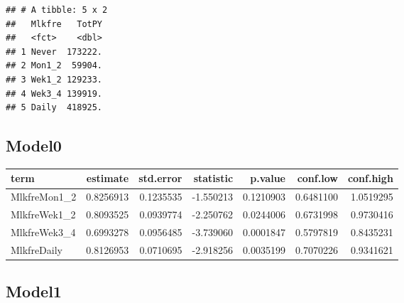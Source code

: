 \documentclass[
]{article}
\newenvironment{Shaded}{\begin{snugshade}}{\end{snugshade}}
\newcommand{\DataTypeTok}[1]{\textcolor[rgb]{0.13,0.29,0.53}{#1}}
\newcommand{\KeywordTok}[1]{\textcolor[rgb]{0.13,0.29,0.53}{\textbf{#1}}}
\newcommand{\NormalTok}[1]{#1}
\newcommand{\OperatorTok}[1]{\textcolor[rgb]{0.81,0.36,0.00}{\textbf{#1}}}
\newcommand{\OtherTok}[1]{\textcolor[rgb]{0.56,0.35,0.01}{#1}}
\newcommand{\StringTok}[1]{\textcolor[rgb]{0.31,0.60,0.02}{#1}}
\begin{document}
\begin{verbatim}
## # A tibble: 5 x 2
##   Mlkfre   TotPY
##   <fct>    <dbl>
## 1 Never  173222.
## 2 Mon1_2  59904.
## 3 Wek1_2 129233.
## 4 Wek3_4 139919.
## 5 Daily  418925.
\end{verbatim}

\hypertarget{model0-2}{%
\subsection{Model0}\label{model0-2}}

\begin{Shaded}
\end{Shaded}

\begin{longtable}[]{@{}lrrrrrr@{}}
\toprule
term & estimate & std.error & statistic & p.value & conf.low &
conf.high\tabularnewline
\midrule
\endhead
MlkfreMon1\_2 & 0.8256913 & 0.1235535 & -1.550213 & 0.1210903 &
0.6481100 & 1.0519295\tabularnewline
MlkfreWek1\_2 & 0.8093525 & 0.0939774 & -2.250762 & 0.0244006 &
0.6731998 & 0.9730416\tabularnewline
MlkfreWek3\_4 & 0.6993278 & 0.0956485 & -3.739060 & 0.0001847 &
0.5797819 & 0.8435231\tabularnewline
MlkfreDaily & 0.8126953 & 0.0710695 & -2.918256 & 0.0035199 & 0.7070226
& 0.9341621\tabularnewline
\bottomrule
\end{longtable}

\hypertarget{model1-2}{%
\subsection{Model1}\label{model1-2}}

\begin{Shaded}
\end{Shaded}
\end{document}
